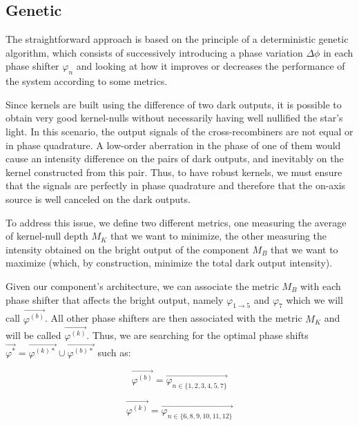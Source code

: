 \documentclass{aa}
\begin{document}
        \subsection{Genetic}
            The straightforward approach is based on the principle of a deterministic genetic algorithm, which consists of successively introducing a phase variation $\Delta \phi$ in each phase shifter $\varphi_n$ and looking at how it improves or decreases the performance of the system according to some metrics.
    
            Since kernels are built using the difference of two dark outputs, it is possible to obtain very good kernel-nulls without necessarily having well nullified the star's light. In this scenario, the output signals of the cross-recombiners are not equal or in phase quadrature. A low-order aberration in the phase of one of them would cause an intensity difference on the pairs of dark outputs, and inevitably on the kernel constructed from this pair. Thus, to have robust kernels, we must ensure that the signals are perfectly in phase quadrature and therefore that the on-axis source is well canceled on the dark outputs.
            
            To address this issue, we define two different metrics, one measuring the average of kernel-null depth $M_K$ that we want to minimize, the other measuring the intensity obtained on the bright output of the component $M_B$ that we want to maximize (which, by construction, minimize the total dark output intensity).
            
            Given our component's architecture, we can associate the metric $M_B$ with each phase shifter that affects the bright output, namely $\varphi_{1 \rightarrow 5}$ and $\varphi_7$ which we will call $\vec{\varphi^{(b)}}$. All other phase shifters are then associated with the metric $M_K$ and will be called $\vec{\varphi^{(k)}}$. Thus, we are searching for the optimal phase shifts $\vec{\varphi^*} = \vec{\varphi^{(k)*}} \cup \vec{\varphi^{(b)*}}$ such as:

            \begin{equation}
                \vec{\varphi^{(b)}} = \vec{\varphi_{n \in \{1,2,3,4,5,7\}}}
            \end{equation}
            
            \begin{equation}
                \vec{\varphi^{(k)}} = \vec{\varphi_{n \in \{6,8,9,10,11,12\}}}
            \end{equation}
    
\end{document}
